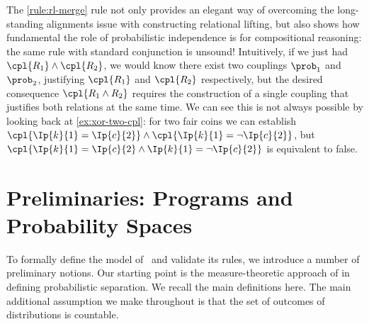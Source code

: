 \documentclass[acmsmall,nonacm,screen,appendix]{acmart}
\begin{document}
The \ref{rule:rl-merge} rule not only provides an elegant way of overcoming
the long-standing alignments issue with constructing relational lifting,
but also shows how fundamental the role of probabilistic independence is
for compositional reasoning:
the same rule with standard conjunction is unsound!
Intuitively, if we just had $ \cpl{R_1} \land \cpl{R_2} $,
we would know there exist two couplings
$\prob_1$ and $\prob_2$,
justifying $\cpl{R_1}$ and $\cpl{R_2}$ respectively,
but the desired consequence $\cpl{R_1 \land R_2}$
requires the construction of a single coupling that justifies both relations
at the same time.
We can see this is not always possible by looking back at
\eqref{ex:xor-two-cpl}:
for two fair coins we can establish
$
  \cpl{ \Ip{k}{1} = \Ip{c}{2} }
  \land
  \cpl{ \Ip{k}{1} = \neg\Ip{c}{2} }
$,
but
$
  \cpl{
    \Ip{k}{1} = \Ip{c}{2}
    \land
    \Ip{k}{1} = \neg\Ip{c}{2}
  }
$ is equivalent to false.



 \section{Preliminaries: Programs and Probability Spaces}
\label{sec:prelims}

To formally define the model of \thelogic\ and validate its rules,
we introduce a number of preliminary notions.
Our starting point is the measure-theoretic approach of
\cite{lilac} in defining probabilistic separation.
We recall the main definitions here.
The main additional assumption we make throughout
is that the set of outcomes of distributions is countable.
\end{document}
